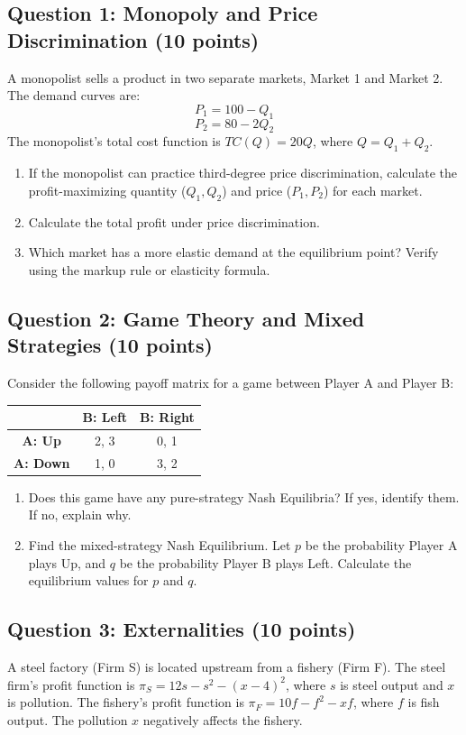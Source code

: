 \documentclass[12pt]{article}
\begin{document}
\subsection*{Question 1: Monopoly and Price Discrimination (10 points)}
A monopolist sells a product in two separate markets, Market 1 and Market 2. The demand curves are:
\[ P_1 = 100 - Q_1 \]
\[ P_2 = 80 - 2Q_2 \]
The monopolist's total cost function is $TC(Q) = 20Q$, where $Q = Q_1 + Q_2$.
\begin{enumerate}
    \item[(a)] If the monopolist can practice third-degree price discrimination, calculate the profit-maximizing quantity ($Q_1, Q_2$) and price ($P_1, P_2$) for each market.
    \item[(b)] Calculate the total profit under price discrimination.
    \item[(c)] Which market has a more elastic demand at the equilibrium point? Verify using the markup rule or elasticity formula.
\end{enumerate}

\subsection*{Question 2: Game Theory and Mixed Strategies (10 points)}
Consider the following payoff matrix for a game between Player A and Player B:

\begin{center}
\begin{tabular}{c|c|c}
 & \textbf{B: Left} & \textbf{B: Right} \\ \hline
\textbf{A: Up} & 2, 3 & 0, 1 \\ \hline
\textbf{A: Down} & 1, 0 & 3, 2 \\
\end{tabular}
\end{center}

\begin{enumerate}
    \item[(a)] Does this game have any pure-strategy Nash Equilibria? If yes, identify them. If no, explain why.
    \item[(b)] Find the mixed-strategy Nash Equilibrium. Let $p$ be the probability Player A plays Up, and $q$ be the probability Player B plays Left. Calculate the equilibrium values for $p$ and $q$.
\end{enumerate}

\subsection*{Question 3: Externalities (10 points)}
A steel factory (Firm S) is located upstream from a fishery (Firm F).
The steel firm's profit function is $\pi_S = 12s - s^2 - (x-4)^2$, where $s$ is steel output and $x$ is pollution.
The fishery's profit function is $\pi_F = 10f - f^2 - xf$, where $f$ is fish output.
The pollution $x$ negatively affects the fishery.
\end{document}
